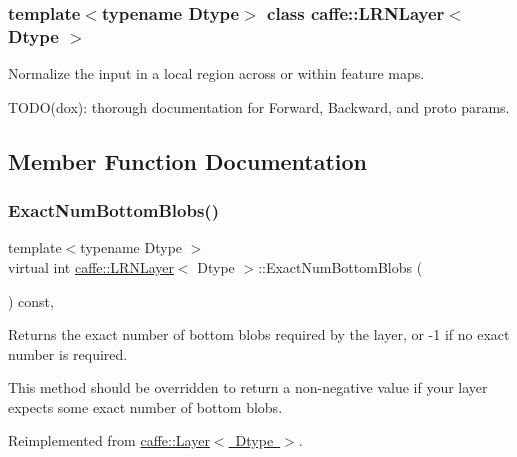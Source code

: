 \subsubsection*{template$<$typename Dtype$>$\newline
class caffe\+::\+L\+R\+N\+Layer$<$ Dtype $>$}

Normalize the input in a local region across or within feature maps. 

T\+O\+D\+O(dox)\+: thorough documentation for Forward, Backward, and proto params. 

\subsection{Member Function Documentation}
\mbox{\label{classcaffe_1_1_l_r_n_layer_a32be44f9f361d29f05261bd174d92321}} 
\subsubsection{\texorpdfstring{Exact\+Num\+Bottom\+Blobs()}{ExactNumBottomBlobs()}\hspace{0.1cm}{\footnotesize\ttfamily [1/2]}}
{\footnotesize\ttfamily template$<$typename Dtype $>$ \\
virtual int \mbox{\hyperlink{classcaffe_1_1_l_r_n_layer}{caffe\+::\+L\+R\+N\+Layer}}$<$ Dtype $>$\+::Exact\+Num\+Bottom\+Blobs (\begin{DoxyParamCaption}{ }\end{DoxyParamCaption}) const\hspace{0.3cm}{\ttfamily [inline]}, {\ttfamily [virtual]}}



Returns the exact number of bottom blobs required by the layer, or -\/1 if no exact number is required. 

This method should be overridden to return a non-\/negative value if your layer expects some exact number of bottom blobs. 

Reimplemented from \mbox{\hyperlink{classcaffe_1_1_layer_a8e5ee0494d85f5f55fc4396537cbc60f}{caffe\+::\+Layer$<$ Dtype $>$}}.

\mbox{\label{classcaffe_1_1_l_r_n_layer_a32be44f9f361d29f05261bd174d92321}} 
